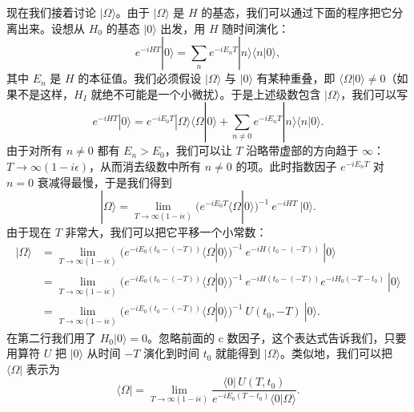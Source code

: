 现在我们接着讨论 $|\Omega\rangle$。由于 $|\Omega\rangle$ 是 $H$ 的基态，我们可以通过下面的程序把它分离出来。设想从 $H_0$ 的基态 $|0\rangle$ 出发，用 $H$ 随时间演化：
\begin{equation}
  e^{-iHT}|0\rangle = \sum_n e^{-iE_nT}|n\rangle\langle n|0\rangle,
\end{equation}
其中 $E_n$ 是 $H$ 的本征值。我们必须假设 $|\Omega\rangle$ 与 $|0\rangle$ 有某种重叠，即 $\langle\Omega|0\rangle\neq 0$（如果不是这样，$H_I$ 就绝不可能是一个小微扰）。于是上述级数包含 $|\Omega\rangle$，我们可以写
\begin{equation}
  e^{-iHT}|0\rangle = e^{-iE_0T}|\Omega\rangle\langle\Omega|0\rangle
    + \sum_{n\neq 0}e^{-iE_nT}|n\rangle\langle n|0\rangle .
\end{equation}
由于对所有 $n\neq 0$ 都有 $E_n > E_0$，我们可以让 $T$ 沿略带虚部的方向趋于 $\infty$：$T\to\infty(1-i\epsilon)$，从而消去级数中所有 $n\neq 0$ 的项。此时指数因子 $e^{-iE_nT}$ 对 $n=0$ 衰减得最慢，于是我们得到
\begin{equation}
  |\Omega\rangle = \lim_{T\to\infty(1-i\epsilon)}
    \bigl( e^{-iE_0T}\langle\Omega|0\rangle \bigr)^{-1}\ e^{-iHT}\ |0\rangle .
  \label{eq:4.27}
\end{equation}
由于现在 $T$ 非常大，我们可以把它平移一个小常数：
\begin{equation}
  \begin{aligned}
    |\Omega\rangle &= \lim_{T\to\infty(1-i\epsilon)}
      \bigl( e^{-iE_0(t_0-(-T))}\langle\Omega|0\rangle \bigr)^{-1}
      \ e^{-iH(t_0-(-T))}\ |0\rangle\\
    &= \lim_{T\to\infty(1-i\epsilon)}
      \bigl( e^{-iE_0(t_0-(-T))}\langle\Omega|0\rangle \bigr)^{-1}
      \ e^{-iH(t_0-(-T))}e^{-iH_0(-T-t_0)}\ |0\rangle\\
    &= \lim_{T\to\infty(1-i\epsilon)}
      \bigl( e^{-iE_0(t_0-(-T))}\langle\Omega|0\rangle \bigr)^{-1}
      \ U(t_0, -T)\ |0\rangle .
  \end{aligned}
  \label{eq:4.28}
\end{equation}
在第二行我们用了 $H_0|0\rangle = 0$。忽略前面的 c 数因子，这个表达式告诉我们，只要用算符 $U$ 把 $|0\rangle$ 从时间 $-T$ 演化到时间 $t_0$ 就能得到 $|\Omega\rangle$。类似地，我们可以把 $\langle\Omega|$ 表示为
\begin{equation}
  \langle\Omega| = \lim_{T\to\infty(1-i\epsilon)}
    \frac{\langle 0|\,U(T, t_0)}
      {e^{-iE_0(T-t_0)}\langle 0|\Omega\rangle} .
\end{equation}


